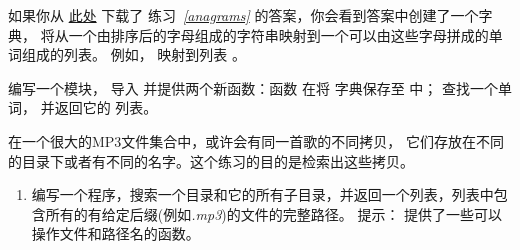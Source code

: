 {{{{{{{\begin{exercise}
如果你从 \href{http://thinkpython2.com/code/anagram_sets.py}{此处} 下载了
练习~{\em \ref{anagrams}} 的答案，你会看到答案中创建了一个字典，
将从一个由排序后的字母组成的字符串映射到一个可以由这些字母拼成的单词组成的列表。
例如， {\em {}} 映射到列表
{\em {}}。


编写一个模块， 导入 {\em {}} 并提供两个新函数：函数 {\em {}} 在将 {\em {}} 字典保存至 {\em {}}中； {\em {}}
 查找一个单词， 并返回它的 {\em {}} 列表。

\end{exercise}

\begin{exercise}
\label{checksum}


在一个很大的MP3文件集合中，或许会有同一首歌的不同拷贝，
它们存放在不同的目录下或者有不同的名字。这个练习的目的是检索出这些拷贝。

\begin{enumerate}


\item 编写一个程序，搜索一个目录和它的所有子目录，并返回一个列表，列表中包含所有的有给定后缀(例如{\em .mp3})的文件的完整路径。 提示： {\em {}}提供了一些可以操作文件和路径名的函数。

  
  



\end{enumerate}
\end{exercise}}}}}}}}
